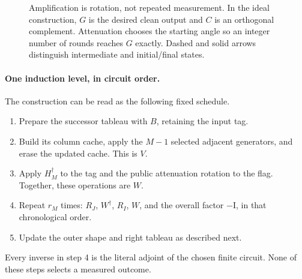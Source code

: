 \documentclass[11pt]{article}
\theoremstyle{definition}
\newcommand{\ket}[1]{\lvert #1\rangle}
\newcommand{\Id}{\mathrm I}
\begin{document}
\begin{figure}[htbp]
\centering
{}
\caption{Amplification is rotation, not repeated measurement. In the
ideal construction, $G$ is the desired clean output and $C$ is an
orthogonal complement. Attenuation chooses the starting angle so an
integer number of rounds reaches $G$ exactly. Dashed and solid arrows
distinguish intermediate and initial/final states.}\label{fig:oaa}
\end{figure}

\paragraph{One induction level, in circuit order.}
The construction can be read as the following fixed schedule.
\begin{enumerate}[label=\arabic*.,leftmargin=1.6em]
\item Prepare the successor tableau with $B$, retaining the input tag.
\item Build its column cache, apply the $M-1$ selected adjacent generators,
      and erase the updated cache. This is $V$.
\item Apply $H_M^\dagger$ to the tag and the public attenuation rotation
      to the flag. Together, these operations are $W$.
\item Repeat $r_M$ times: $R_J$, $W^\dagger$, $R_I$, $W$, and the
      overall factor $-\Id$, in that chronological order.
\item Update the outer shape and right tableau as described next.
\end{enumerate}
Every inverse in step 4 is the literal adjoint of the chosen finite
circuit. None of these steps selects a measured outcome.
\end{document}
